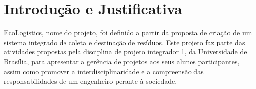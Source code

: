\section{Introdução e Justificativa}

  EcoLogistics, nome do projeto, foi definido a partir da proposta de
  criação de um sistema integrado de coleta e destinação de resíduos.
  Este projeto faz parte das atividades propostas pela disciplina
  de projeto integrador 1, da Universidade de Brasília, para
  apresentar a gerência de projetos aos seus alunos participantes,
   assim como promover a interdisciplinaridade e a compreensão das
   responsabilidades de um engenheiro perante à sociedade.
